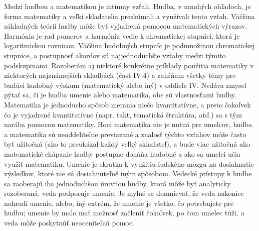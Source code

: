 Medzi hudbou a matematikou je intímny vzťah. Hudba, v mnohých ohľadoch, je forma matematiky a veľkí skladatelia preskúmali a využívali tento vzťah. Väčšina základných teórií hudby môže byť vyjadrená pomocou matematických výrazov. Harmónia je rad pomerov a harmónia vedie k chromatickej stupnici, ktorá je logaritmickou rovnicou. Väčšina hudobných stupníc je podmnožinou chromatickej stupnice, a postupnosť akordov sú najjednoduchšie vzťahy medzi týmito podskupinami. Rozoberám aj niektoré konkrétne príklady použitia matematiky v niektorých najznámejších skladbách (časť IV.4) a zahŕňam všetky témy pre budúci hudobný výskum (matematický alebo iný) v oddiele IV. Nedáva zmysel pýtať sa, či je hudba umenie alebo matematika, obe sú vlastnosťami hudby. Matematika je jednoducho spôsob merania niečo kvantitatívne, a preto čokoľvek čo je vyjadrené kvantitatívne (napr. takt, tematická  štruktúra, atď.) sa s tým narába pomocou matematiky. Hoci matematika nie je nutná pre umelcov, hudba a matematika sú neoddeliteľne previazané a znalosť týchto vzťahov môže často byť užitočná (ako to preukázal každý veľký skladateľ), a bude viac užitočná ako matematické chápanie hudby postupne doháňa hudobné a ako sa umelci učia využiť matematiku. Umenie je skratka k využitiu ľudského mozgu na dosiahnutie výsledkov, ktoré nie sú dosiahnuteľné iným spôsobom. Vedecké prístupy k hudbe sa zaoberajú iba jednoduchšou úrovňou hudby, ktorá môže byť analyticky rozoberaná: veda podporuje umenie. Je mylné sa domnievať, že veda nakoniec nahradí umenie, alebo, iný extrém, že umenie je všetko, čo potrebujete pre hudbu; umenie by malo mať možnosť začleniť čokoľvek, po čom umelec túži, a veda môže poskytnúť neoceniteľnú pomoc.

